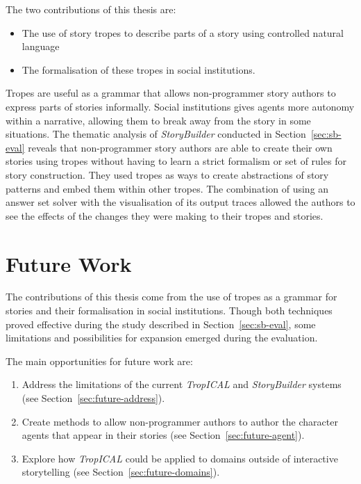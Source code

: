 \documentclass[11pt]{report}
\begin{document}
The two contributions of this thesis are:

\begin{itemize}
  \item The use of story tropes to describe parts of a story using
    controlled natural language
  \item The formalisation of these tropes in social institutions.
\end{itemize}

Tropes are useful as a grammar that allows non-programmer story authors to express parts of stories
informally. Social institutions gives agents more autonomy within a narrative,
allowing them to break away from the story in some situations. The thematic analysis of \emph{StoryBuilder} conducted in Section~\ref{sec:sb-eval} reveals that
non-programmer story authors are able to create their own stories using tropes without having
to learn a strict formalism or set of rules for story construction. They used
tropes as ways to create abstractions of story patterns and embed them within
other tropes. The combination of using an answer set solver with the
visualisation of its output traces allowed the authors to see the effects of the
changes they were making to their tropes and stories.

\section{Future Work}
\label{sec:future}

The contributions of this thesis come from the use of tropes as a grammar for
stories and their formalisation in social institutions. Though both techniques
proved effective during the study described in Section~\ref{sec:sb-eval}, some limitations and possibilities for
expansion emerged during the evaluation.

The main opportunities for future work are:

\begin{enumerate}[{Opportunity} 1:]
\item\label{opp:limitations} Address the limitations of the current \emph{TropICAL} and
  \emph{StoryBuilder} systems (see Section~\ref{sec:future-address}).
\item\label{opp:agents} Create methods to allow non-programmer authors to author the
    character agents that appear in their stories (see Section~\ref{sec:future-agent}).
  \item\label{opp:domains} Explore how \emph{TropICAL} could be applied to domains outside of
    interactive storytelling (see Section~\ref{sec:future-domains}).
\end{enumerate}
\end{document}
